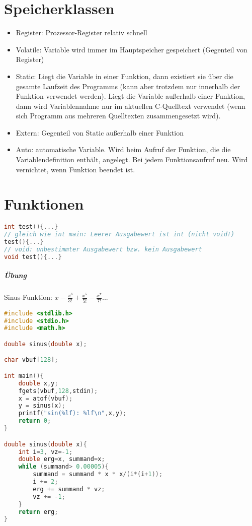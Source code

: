 \chapter{Speicherklassen}
\begin{itemize}
\item Register: Prozessor-Register relativ schnell
\item Volatile: Variable wird immer im Hauptspeicher gespeichert (Gegenteil von Register)
\item Static: Liegt die Variable in einer Funktion, dann existiert sie über die gesamte Laufzeit des Programms (kann aber trotzdem nur innerhalb der Funktion verwendet werden). Liegt die Variable außerhalb einer Funktion, dann wird Variablennahme nur im aktuellen C-Quelltext verwendet (wenn sich Programm aus mehreren Quelltexten zusammengesetzt wird).
\item Extern: Gegenteil von Static außerhalb einer Funktion
\item Auto: automatische Variable. Wird beim Aufruf der Funktion, die die Variablendefinition enthält, angelegt. Bei jedem Funktionsaufruf neu. Wird vernichtet, wenn Funktion beendet ist.
\end{itemize}

\chapter{Funktionen}
\begin{lstlisting}[language=C]
int test(){...}
// gleich wie int main: Leerer Ausgabewert ist int (nicht void!)
test(){...}
// void: unbestimmter Ausgabewert bzw. kein Ausgabewert
void test(){...}
\end{lstlisting}

\paragraph{Übung} Sinus-Funktion: $x-\frac{x^3}{3!}+\frac{x^5}{5!}-\frac{x^7}{7!}...$
\begin{lstlisting}[language=C]
#include <stdlib.h>
#include <stdio.h>
#include <math.h>

double sinus(double x);

char vbuf[128];

int main(){
	double x,y;
	fgets(vbuf,128,stdin); 
	x = atof(vbuf);
	y = sinus(x);
	printf("sin(%lf): %lf\n",x,y);
	return 0;
}

double sinus(double x){
	int i=3, vz=-1;
	double erg=x, summand=x;
	while (summand> 0.00005){
		summand = summand * x * x/(i*(i+1));
		i += 2;
		erg += summand * vz;
		vz += -1;
	}
	return erg;
}

\end{lstlisting}

